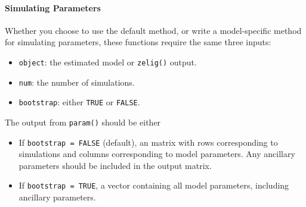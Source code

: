 \paragraph{Simulating Parameters}

Whether you choose to use the default method, or write a
model-specific method for simulating parameters, these functions
require the same three inputs:  
\begin{itemize}
\item {\tt object}: the estimated model or {\tt zelig()} output.
\item {\tt num}: the number of simulations.
\item {\tt bootstrap}: either {\tt TRUE} or {\tt FALSE}.  
\end{itemize}
The output from {\tt param()} should be either
\begin{itemize}
\item If {\tt bootstrap = FALSE} (default), an matrix with rows
corresponding to simulations and columns corresponding to model
parameters.  Any ancillary parameters should be included in the output
matrix.  
\item If {\tt bootstrap = TRUE}, a vector containing all model
parameters, including ancillary parameters.    
\end{itemize} 

